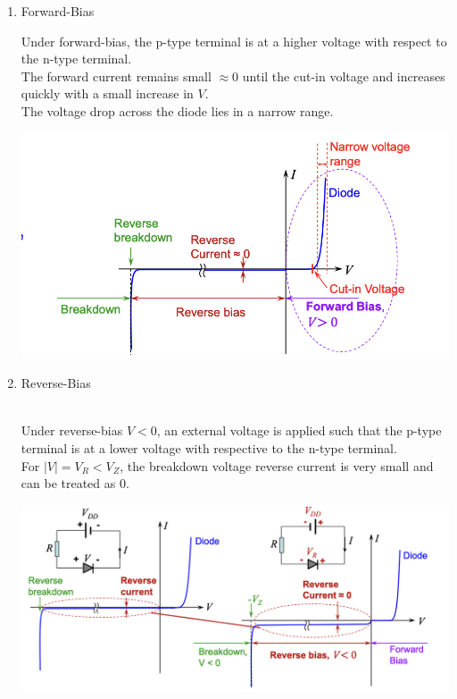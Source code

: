 \documentclass{article}
\begin{document}
\begin{enumerate}
\begin{enumerate}
\begin{minipage}{0.6\textwidth}
            \end{minipage}
    \end{enumerate}
    \item Forward-Bias \\
    \begin{minipage}{0.4\textwidth}
        Under forward-bias, the p-type terminal is at a higher voltage with respect to the n-type terminal. \\
        The forward current remains small $\approx 0$ until the cut-in voltage and increases quickly with a small increase in $V$. \\
        The voltage drop across the diode lies in a narrow range.
    \end{minipage}
    \begin{minipage}{0.6\textwidth}
        \includegraphics[width=1\linewidth]{image/diodeforawd.png}
    \end{minipage}
    \item Reverse-Bias \\
    \\
    \begin{minipage}{0.4\textwidth}
        Under reverse-bias $V<0$, an external voltage is applied such that the p-type terminal is at a lower voltage with respective to the n-type terminal. \\       
        For $\displaystyle |V| = V_R < V_Z$, the breakdown voltage reverse current is very small and can be treated as 0.
    \end{minipage}
    \begin{minipage}{0.6\textwidth}
        \includegraphics[width=1\linewidth]{image/reversebias.png}

\end{minipage}
\end{enumerate}
\end{document}
